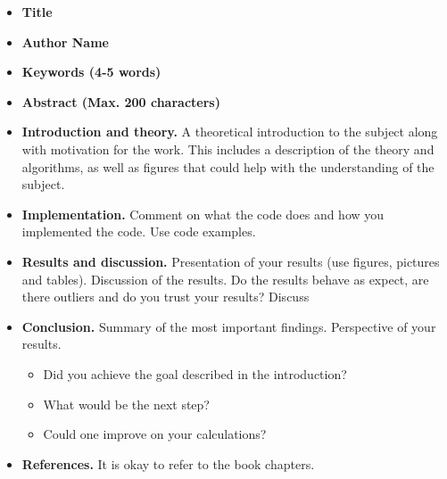 \documentclass{article}
\begin{document}
\begin{itemize}

    \item {\bf Title}

    \item {\bf Author Name}

    \item {\bf Keywords (4-5 words)}

    \item {\bf Abstract (Max. 200 characters)}

    \item {\bf Introduction and theory.}
    A theoretical introduction to the subject along with motivation for the work.
    This includes a description of the theory and algorithms, as well as figures that could help with the understanding of the subject.

    \item {\bf Implementation.}
    Comment on what the code does and how you implemented the code.
    Use code examples.

    \item {\bf Results and discussion.}
    Presentation of your results (use figures, pictures and tables).
    Discussion of the results.
    Do the results behave as expect, are there outliers and 
    do you trust your results? Discuss 

    \item {\bf Conclusion.}
    Summary of the most important findings.
    Perspective of your results.

    \begin{itemize}
        \item Did you achieve the goal described in the introduction?
        \item What would be the next step?
        \item Could one improve on your calculations?
    \end{itemize}

    \item {\bf References.}
    It is okay to refer to the book chapters.

\end{itemize}











\end{document}
